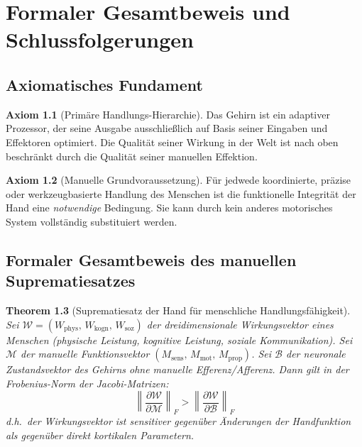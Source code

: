 ﻿\documentclass[12pt,a4paper]{report}
\theoremstyle{plain}
\newtheorem{theorem}{Theorem}[section]
\theoremstyle{definition}
\newtheorem{axiom}[theorem]{Axiom}
\theoremstyle{remark}
\begin{document}
\chapter{Formaler Gesamtbeweis und Schlussfolgerungen}
\label{chap:beweis}

\section{Axiomatisches Fundament}

\begin{axiom}[Primäre Handlungs-Hierarchie]
\label{ax:primaer}
Das Gehirn ist ein adaptiver Prozessor, der seine Ausgabe ausschließlich
auf Basis seiner Eingaben und Effektoren optimiert. Die Qualität seiner
Wirkung in der Welt ist nach oben beschränkt durch die Qualität seiner
manuellen Effektion.
\end{axiom}

\begin{axiom}[Manuelle Grundvoraussetzung]
\label{ax:manuell}
Für jedwede koordinierte, präzise oder werkzeugbasierte Handlung des Menschen
ist die funktionelle Integrität der Hand eine \emph{notwendige} Bedingung.
Sie kann durch kein anderes motorisches System vollständig substituiert werden.
\end{axiom}

\section{Formaler Gesamtbeweis des manuellen Suprematiesatzes}
\label{sec:formaler_beweis}

\begin{theorem}[Suprematiesatz der Hand für menschliche Handlungsfähigkeit]
\label{thm:supremat}
Sei $\mathcal{W} = (W_{\text{phys}},\, W_{\text{kogn}},\, W_{\text{soz}})$
der dreidimensionale \emph{Wirkungsvektor} eines Menschen (physische Leistung,
kognitive Leistung, soziale Kommunikation). Sei $\mathcal{M}$  der manuelle
Funktionsvektor $(M_{\text{sens}},\, M_{\text{mot}},\, M_{\text{prop}})$.
Sei $\mathcal{B}$ der neuronale Zustandsvektor des Gehirns ohne manuelle
Efferenz/Afferenz. Dann gilt in der Frobenius-Norm der Jacobi-Matrizen:
\[
  \left\|\frac{\partial \mathcal{W}}{\partial \mathcal{M}}\right\|_F
  > \left\|\frac{\partial \mathcal{W}}{\partial \mathcal{B}}\right\|_F
\]
d.h.\ der Wirkungsvektor ist sensitiver gegenüber Änderungen der Handfunktion
als gegenüber direkt kortikalen Parametern.
\end{theorem}
\end{document}
